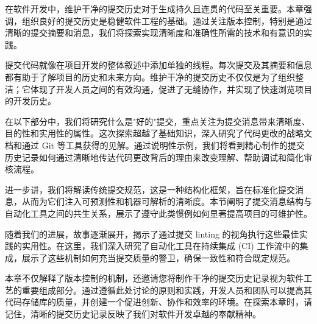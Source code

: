 在软件开发中，维护干净的提交历史对于生成持久且连贯的代码至关重要。本章强调，组织良好的提交历史是稳健软件工程的基础。通过关注版本控制，特别是通过清晰的提交摘要和消息，我们将探索实现清晰度和准确性所需的技术和有意识的实践。

提交代码就像在项目开发的整体叙述中添加单独的线程。每次提交及其摘要和信息都有助于了解项目的历史和未来方向。维护干净的提交历史不仅仅是为了组织整洁；它体现了开发人员之间的有效沟通，促进了无缝协作，并实现了快速浏览项目的开发历史。

在以下部分中，我们将研究什么是"好的"提交，重点关注为提交消息带来清晰度、目的性和实用性的属性。这次探索超越了基础知识，深入研究了代码更改的战略文档和通过 Git 等工具获得的见解。通过说明性示例，我们将看到精心制作的提交历史记录如何通过清晰地传达代码更改背后的理由来改变理解、帮助调试和简化审核流程。

进一步讲，我们将解读传统提交规范，这是一种结构化框架，旨在标准化提交消息，从而为它们注入可预测性和机器可解析的清晰度。本节阐明了提交消息结构与自动化工具之间的共生关系，展示了遵守此类惯例如何显著提高项目的可维护性。

随着我们的进展，故事逐渐展开，揭示了通过提交 linting 的视角执行这些最佳实践的实用性。在这里，我们深入研究了自动化工具在持续集成 (CI) 工作流中的集成，展示了这些机制如何充当提交质量的警卫，确保一致性和符合既定规范。

本章不仅解释了版本控制的机制，还邀请您将制作干净的提交历史记录视为软件工艺的重要组成部分。通过遵循此处讨论的原则和实践，开发人员和团队可以提高其代码存储库的质量，并创建一个促进创新、协作和效率的环境。在探索本章时，请记住，清晰的提交历史记录反映了我们对软件开发卓越的奉献精神。
